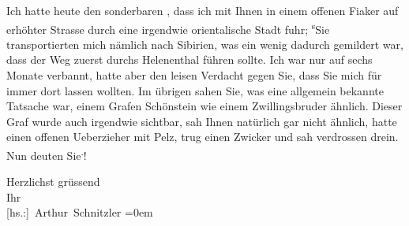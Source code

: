 \pstart
           Ich hatte heute den sonderbaren \label{K_L03779-5v}\label{K_L03779-5}, dass
               ich mit Ihnen in einem offenen Fiaker auf erhöhter Strasse durch eine irgendwie
               orientalische Stadt fuhr; \substVorne{}\textsuperscript{s}\substDazwischen{}S\substHinten{}ie transportierten mich nämlich nach Sibirien, was ein wenig dadurch gemildert war, dass der Weg zuerst durchs
                  Helenenthal führen sollte. Ich war nur auf
               sechs Monate verbannt, hatte aber den leisen Verdacht gegen Sie, dass Sie mich für
               immer dort lassen wollten. Im übrigen sahen Sie, was eine allgemein bekannte Tatsache
               war, einem Grafen Schönstein wie einem Zwillingsbruder ähnlich. Dieser Graf wurde
               auch irgendwie sichtbar, sah Ihnen natürlich gar nicht ähnlich, hatte einen offenen
               Ueberzieher mit Pelz, trug einen Zwicker und sah verdrossen drein. Nun deuten Sie\substVorne{}\textsuperscript{.}\substDazwischen{}!\substHinten{}\pend
           
\pstart
           Herzlichst grüssend{\\[\baselineskip]}Ihr{\\[\baselineskip]}\spacefill\mbox{{[}hs.:{]} Arthur Schnitzler}\pend
           \leftskip=0em{}\endnumbering{}  \newcommand{\dateiname}{L03779}\newcommand{\titel}{Arthur Schnitzler an Stefan Zweig, 2. 12. 1914}\newcommand{\editorInnen}{Selma Jahnke und Martin Anton Müller}
